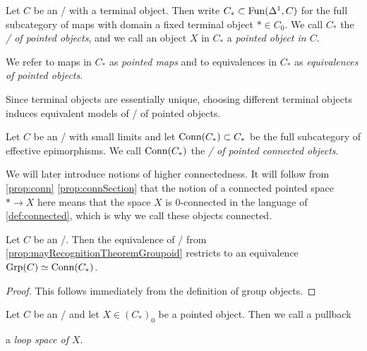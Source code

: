 \begin{definition}
    Let $C$ be an \inftycat/ with a terminal object.
    Then write $C_*\subset\operatorname{Fun}(\Delta^1,C)$ for the full subcategory of maps with domain a fixed terminal object $*\in C_0$.
    We call $C_*$ the \emph{\inftycat/ of pointed objects}, and we call an object $X$ in $C_*$ a \emph{pointed object in $C$}.

    We refer to maps in $C_*$ as \emph{pointed maps} and to equivalences in $C_*$ as \emph{equivalences of pointed objects}.
\end{definition}
\begin{remark}
    Since terminal objects are essentially unique, choosing different terminal objects induces equivalent models of \inftycats/ of pointed objects.
\end{remark}
\begin{definition}\label{def:catOfPtdConnObj}
    Let $C$ be an \inftycat/ with small limits and let $\operatorname{Conn}(C_*)\subset C_*$ be the full subcategory of effective epimorphisms.
    We call $\operatorname{Conn}(C_*)$ the \emph{\inftycat/ of pointed connected objects}.
\end{definition}
\begin{remark}
    We will later introduce notions of higher connectedness. 
    It will follow from \cref{prop:conn} \ref{prop:connSection} that the notion of a connected pointed space $*\to X$ here means that the space $X$ is $0$-connected in the language of \cref{def:connected}, which is why we call these objects connected.
\end{remark}
\begin{corollary}\label{prop:mayRecognitionTheoremGroup}
    Let $C$ be an \inftytop/. 
    Then the equivalence of \inftycats/ from \cref{prop:mayRecognitionTheoremGroupoid} restricts to an equivalence $\operatorname{Grp}(C)\simeq\operatorname{Conn}(C_*)$.
    \begin{proof}
        This follows immediately from the definition of group objects.
    \end{proof}
\end{corollary}
\begin{definition}\label{def:loopSpace}
    Let $C$ be an \inftytop/ and let $X\in\left(C_*\right)_0$ be a pointed object.
    Then we call a pullback
    \begin{center}
    \end{center}
    a \emph{loop space of $X$}.
\end{definition}
